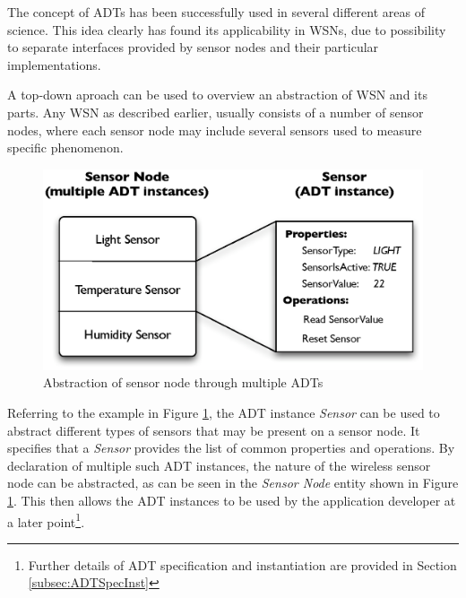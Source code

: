 
The concept of ADTs has been successfully used in several different areas of
science. This idea clearly has found its applicability in WSNs, due to
possibility to separate interfaces provided by sensor nodes and their particular
implementations. 


A top-down aproach can be used to overview an abstraction of WSN and its parts.
Any WSN as described earlier, usually consists of a number of sensor nodes, where each
sensor node may include several sensors used to measure specific phenomenon.

\begin{figure}[h]
\centering
\includegraphics[scale=0.71]{img/ADTsMultipleInstances.eps}
\caption[Abstraction of sensor node through multiple ADTs]{Abstraction of sensor node through multiple ADTs}
\label{Fig:MultipleADTs}
\end{figure} 
  
Referring to the example in Figure \ref{Fig:MultipleADTs}, the ADT instance
\emph{Sensor} can be used to abstract different types of sensors that may be
present on a sensor node. It specifies that a \emph{Sensor} provides the list of
common properties and operations. By declaration of multiple such ADT instances,
the nature of the wireless sensor node can be abstracted, as can be seen in the
\emph{Sensor Node} entity shown in Figure \ref{Fig:MultipleADTs}. This then
allows the ADT instances to be used by the application developer at a later
point\footnote{Further details of ADT specification and instantiation are
provided in Section \ref{subsec:ADTSpecInst}}.

